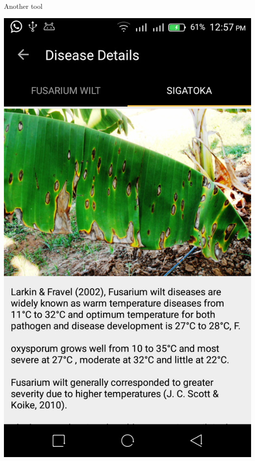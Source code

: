 \documentclass{beamer}
\begin{document}
\begin{frame}{Another tool}
\begin{minipage}[b]{0.4\textwidth}
\end{minipage}
\hfill
\begin{minipage}[b]{0.4\textwidth}
   \includegraphics[width=\textwidth]{figs/banana4.png}
  \end{minipage}

\end{frame}
\end{document}
